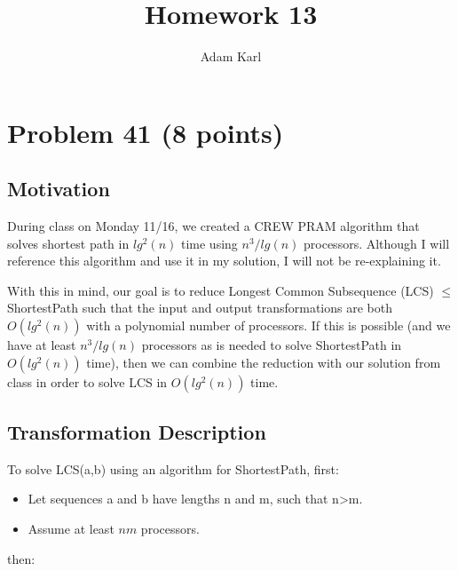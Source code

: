 \documentclass[a4paper]{article}
\title{Homework 13}
\author{Adam Karl}
\begin{document}
\maketitle

\section{Problem 41 (8 points)}
\subsection{Motivation}
During class on Monday 11/16, we created a CREW PRAM algorithm that solves shortest path in $lg^2(n)$ time using $n^3/lg(n)$ processors. Although I will reference this algorithm and use it in my solution, I will not be re-explaining it.

With this in mind, our goal is to reduce Longest Common Subsequence (LCS) $\leq$ ShortestPath such that the input and output transformations are both $O(lg^2(n))$ with a polynomial number of processors. If this is possible (and we have at least $n^3/lg(n)$ processors as is needed to solve ShortestPath in $O(lg^2(n))$ time), then we can combine the reduction with our solution from class in order to solve LCS in $O(lg^2(n))$ time.

\subsection{Transformation Description}

To solve LCS(a,b) using an algorithm for ShortestPath, first:

\begin{itemize}
    \item Let sequences a and b have lengths n and m, such that n>m.
    \item Assume at least $nm$ processors.
\end{itemize}

then:
\end{document}
